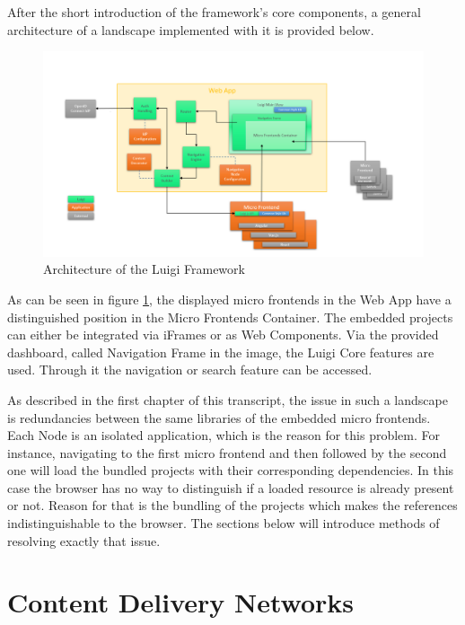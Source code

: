 After the short introduction of the framework's core components, a general architecture of a landscape implemented with it is provided below.

\begin{figure}[!h]
	\centering
	\includegraphics[width=1\textwidth]{Figures/Luigi_Architektur.png}
	\caption{Architecture of the Luigi Framework \cite{luigi_architecture}}
	\label{fig:luigi_architecture_fig}
\end{figure}

As can be seen in figure \ref{fig:luigi_architecture_fig}, the displayed micro frontends in the Web App have a distinguished position in the Micro Frontends Container. The embedded projects can either be integrated via iFrames or as Web Components.
Via the provided dashboard, called Navigation Frame in the image, the Luigi Core features are used. Through it the navigation or search feature can be accessed.

As described in the first chapter of this transcript, the issue in such a landscape is redundancies between the same libraries of the embedded micro frontends. Each Node is an isolated application, which is the reason for this problem.
For instance, navigating to the first micro frontend and then followed by the second one will load the bundled projects with their corresponding dependencies. In this case the browser has no way to distinguish if a loaded resource is already present or not. Reason for that is the bundling of the projects which makes the references indistinguishable to the browser.
The sections below will introduce methods of resolving exactly that issue. 

\section{Content Delivery Networks}
\label{cdn_intro}


